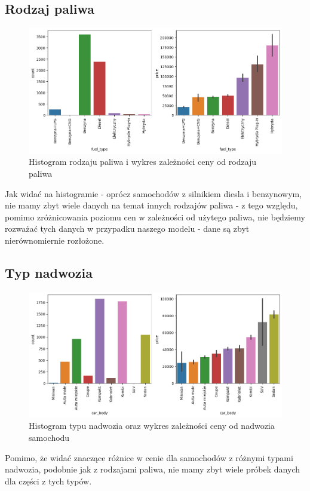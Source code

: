 \documentclass{article}
\begin{document}
\subsection{Rodzaj paliwa}
\begin{figure}[H]
    \centering
    \includegraphics[width=1\linewidth]{images/typ_paliwa.png}
    \caption{Histogram rodzaju paliwa i wykres zależności ceny od rodzaju paliwa}
    \label{plt:fuel_type}
\end{figure}
Jak widać na histogramie - oprócz samochodów z silnikiem diesla i benzynowym, nie mamy zbyt wiele danych na temat innych rodzajów paliwa - z tego względu, pomimo zróżnicowania poziomu cen w zależności od użytego paliwa, nie będziemy rozważać tych danych w przypadku naszego modelu - dane są zbyt nierównomiernie rozłożone. 

\subsection{Typ nadwozia}
\begin{figure}[H]
    \centering
    \includegraphics[width=1\linewidth]{images/rodzaj_nadwozia.png}
    \caption{Histogram typu nadwozia oraz wykres zależności ceny od nadwozia samochodu}
    \label{plt:car_body}
\end{figure}
Pomimo, że widać znaczące różnice w cenie dla samochodów z różnymi typami nadwozia, podobnie jak z rodzajami paliwa, nie mamy zbyt wiele próbek danych dla części z tych typów.
\end{document}
